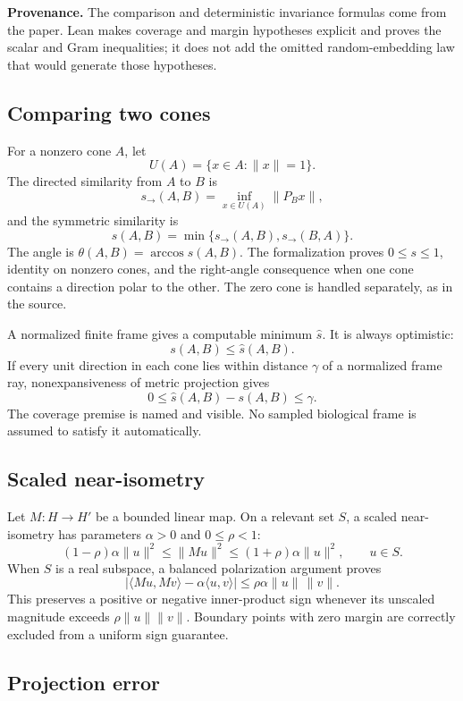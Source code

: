 \documentclass[11pt,a4paper]{article}
\begin{document}
\textbf{Provenance.} The comparison and deterministic invariance formulas come
from the paper. Lean makes coverage and margin hypotheses explicit and proves
the scalar and Gram inequalities; it does not add the omitted random-embedding
law that would generate those hypotheses.

\subsection{Comparing two cones}

For a nonzero cone \(A\), let
\[
  U(A)=\{x\in A:\|x\|=1\}.
\]
The directed similarity from \(A\) to \(B\) is
\[
  s_\to(A,B)=\inf_{x\in U(A)}\|P_Bx\|,
\]
and the symmetric similarity is
\[
  s(A,B)=\min\{s_\to(A,B),s_\to(B,A)\}.
\]
The angle is \(\theta(A,B)=\arccos s(A,B)\). The formalization proves
\(0\leq s\leq1\), identity on nonzero cones, and the right-angle consequence
when one cone contains a direction polar to the other. The zero cone is
handled separately, as in the source.

A normalized finite frame gives a computable minimum \(\widehat{s}\). It is
always optimistic:
\[
  s(A,B)\leq\widehat{s}(A,B).
\]
If every unit direction in each cone lies within distance \(\gamma\) of a
normalized frame ray, nonexpansiveness of metric projection gives
\[
  0\leq\widehat{s}(A,B)-s(A,B)\leq\gamma.
\]
The coverage premise is named and visible. No sampled biological frame is
assumed to satisfy it automatically.

\subsection{Scaled near-isometry}

Let \(M:H\to H'\) be a bounded linear map. On a relevant set \(S\), a scaled
near-isometry has parameters \(\alpha>0\) and \(0\leq\rho<1\):
\[
  (1-\rho)\alpha\|u\|^2
  \leq\|Mu\|^2
  \leq(1+\rho)\alpha\|u\|^2,
  \qquad u\in S.
\]
When \(S\) is a real subspace, a balanced polarization argument proves
\[
  \left|
    \langle Mu,Mv\rangle-\alpha\langle u,v\rangle
  \right|
  \leq\rho\alpha\|u\|\,\|v\|.
\]
This preserves a positive or negative inner-product sign whenever its
unscaled magnitude exceeds \(\rho\|u\|\|v\|\). Boundary points with zero
margin are correctly excluded from a uniform sign guarantee.

\subsection{Projection error}
\end{document}
